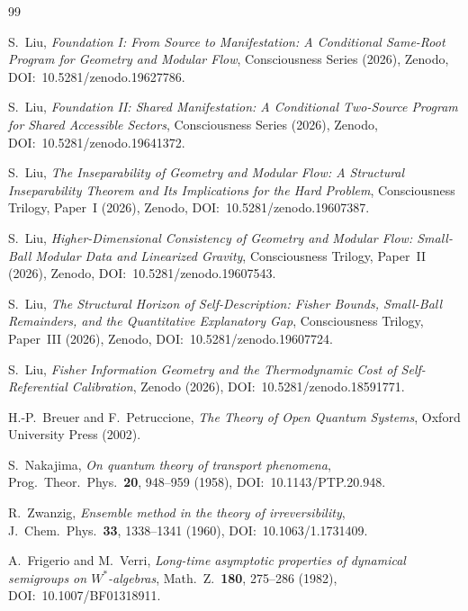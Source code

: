 \documentclass[12pt]{article}
\theoremstyle{definition}
\theoremstyle{remark}
\begin{document}
\begin{thebibliography}{99}
\sloppy

S.~Liu,
\emph{Foundation I: From Source to Manifestation: A Conditional Same-Root Program for Geometry and Modular Flow},
Consciousness Series (2026),
Zenodo, DOI:~10.5281/zenodo.19627786.

S.~Liu,
\emph{Foundation II: Shared Manifestation: A Conditional Two-Source Program for Shared Accessible Sectors},
Consciousness Series (2026),
Zenodo, DOI:~10.5281/zenodo.19641372.

S.~Liu,
\emph{The Inseparability of Geometry and Modular Flow: A Structural Inseparability Theorem and Its Implications for the Hard Problem},
Consciousness Trilogy, Paper~I (2026),
Zenodo, DOI:~10.5281/zenodo.19607387.

S.~Liu,
\emph{Higher-Dimensional Consistency of Geometry and Modular Flow: Small-Ball Modular Data and Linearized Gravity},
Consciousness Trilogy, Paper~II (2026),
Zenodo, DOI:~10.5281/zenodo.19607543.

S.~Liu,
\emph{The Structural Horizon of Self-Description: Fisher Bounds, Small-Ball Remainders, and the Quantitative Explanatory Gap},
Consciousness Trilogy, Paper~III (2026),
Zenodo, DOI:~10.5281/zenodo.19607724.

S.~Liu,
\emph{Fisher Information Geometry and the Thermodynamic Cost of Self-Referential Calibration},
Zenodo (2026), DOI:~10.5281/zenodo.18591771.

H.-P.~Breuer and F.~Petruccione,
\emph{The Theory of Open Quantum Systems},
Oxford University Press (2002).

S.~Nakajima,
\emph{On quantum theory of transport phenomena},
Prog.\ Theor.\ Phys.\ \textbf{20}, 948--959 (1958),
DOI:~10.1143/PTP.20.948.

R.~Zwanzig,
\emph{Ensemble method in the theory of irreversibility},
J.\ Chem.\ Phys.\ \textbf{33}, 1338--1341 (1960),
DOI:~10.1063/1.1731409.

A.~Frigerio and M.~Verri,
\emph{Long-time asymptotic properties of dynamical semigroups on \(W^*\)-algebras},
Math.\ Z.\ \textbf{180}, 275--286 (1982),
DOI:~10.1007/BF01318911.

\end{thebibliography}
\end{document}
